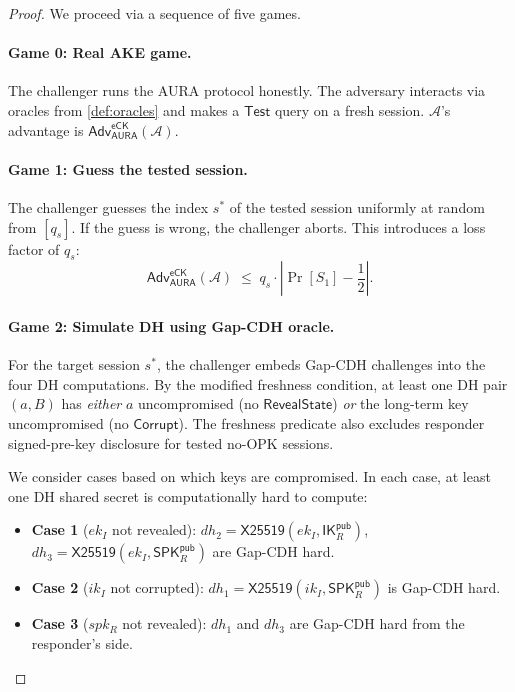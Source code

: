 \documentclass[11pt,a4paper]{article}
\theoremstyle{definition}
\theoremstyle{remark}
\newcommand{\adv}{\mathsf{Adv}}
\newcommand{\advA}{\mathcal{A}}
\renewcommand{\DH}{\mathsf{X25519}}
\newcommand{\eCK}{\mathsf{eCK}}
\newcommand{\IK}{\mathsf{IK}}
\newcommand{\SPK}{\mathsf{SPK}}
\begin{document}
\begin{proof}
We proceed via a sequence of five games.

\paragraph{Game 0: Real AKE game.}
The challenger runs the AURA protocol honestly.  The adversary interacts via
oracles from \cref{def:oracles} and makes a $\mathsf{Test}$ query on a fresh
session.  $\advA$'s advantage is $\adv^{\eCK}_{\mathsf{AURA}}(\advA)$.

\paragraph{Game 1: Guess the tested session.}
The challenger guesses the index $s^*$ of the tested session uniformly at
random from $[q_s]$.  If the guess is wrong, the challenger aborts.
This introduces a loss factor of $q_s$:
\[
  \adv^{\eCK}_{\mathsf{AURA}}(\advA)
  \;\leq\; q_s \cdot \left|\Pr[S_1] - \frac{1}{2}\right|.
\]

\paragraph{Game 2: Simulate DH using Gap-CDH oracle.}
For the target session $s^*$, the challenger embeds Gap-CDH challenges into
the four DH computations. By the modified freshness condition, at least one
DH pair $(a, B)$ has \emph{either} $a$ uncompromised (no $\mathsf{RevealState}$)
\emph{or} the long-term key uncompromised (no $\mathsf{Corrupt}$). The
freshness predicate also excludes responder signed-pre-key disclosure for
tested no-OPK sessions.

We consider cases based on which keys are compromised.  In each case, at
least one DH shared secret is computationally hard to compute:
\begin{itemize}[nosep]
  \item \textbf{Case 1} ($ek_I$ not revealed): $\mathit{dh}_2 = \DH(ek_I, \IK_R^{\mathsf{pub}})$,
        $\mathit{dh}_3 = \DH(ek_I, \SPK_R^{\mathsf{pub}})$ are Gap-CDH hard.
  \item \textbf{Case 2} ($ik_I$ not corrupted): $\mathit{dh}_1 = \DH(ik_I, \SPK_R^{\mathsf{pub}})$ is Gap-CDH hard.
  \item \textbf{Case 3} ($spk_R$ not revealed): $\mathit{dh}_1$ and $\mathit{dh}_3$
        are Gap-CDH hard from the responder's side.
\end{itemize}


\end{proof}
\end{document}
